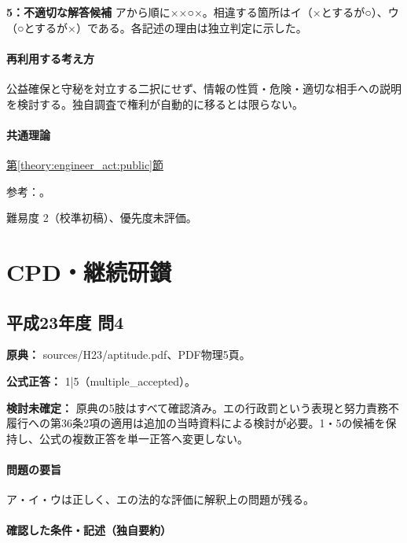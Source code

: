 \noindent\textbf{5：不適切な解答候補} アから順に××○×。相違する箇所はイ（×とするが○）、ウ（○とするが×）である。各記述の理由は独立判定に示した。\par

\paragraph{再利用する考え方} 公益確保と守秘を対立する二択にせず、情報の性質・危険・適切な相手への説明を検討する。独自調査で権利が自動的に移るとは限らない。

\paragraph{共通理論} \hyperref[theory:engineer_act:public]{第\ref*{theory:engineer_act:public}節}

\par 参考：\cite{engineer_act_current,cpd_v3}。

\par 難易度 2（校準初稿）、優先度未評価。

\section{CPD・継続研鑚}

\subsection{平成23年度 問4}
\label{q:h23-reg-apt-04}

\noindent\textbf{原典：} sources/H23/aptitude.pdf、PDF物理5頁。

\textbf{公式正答：} 1|5（multiple\_accepted）。

\par\textbf{検討未確定：} 原典の5肢はすべて確認済み。エの行政罰という表現と努力責務不履行への第36条2項の適用は追加の当時資料による検討が必要。1・5の候補を保持し、公式の複数正答を単一正答へ変更しない。

\paragraph{問題の要旨} ア・イ・ウは正しく、エの法的な評価に解釈上の問題が残る。

\paragraph{確認した条件・記述（独自要約）}\mbox{}\par

